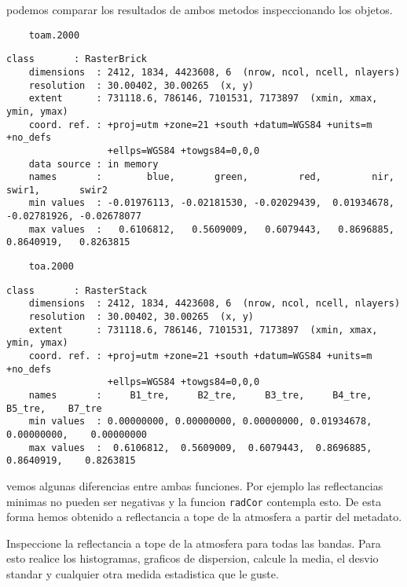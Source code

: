 \begin{exa}
    podemos comparar los resultados de ambos metodos inspeccionando los objetos.
    \begin{lstlisting}
    toam.2000 
    \end{lstlisting}
    \begin{Verbatim}[fontsize=\small]
    class       : RasterBrick 
    dimensions  : 2412, 1834, 4423608, 6  (nrow, ncol, ncell, nlayers)
    resolution  : 30.00402, 30.00265  (x, y)
    extent      : 731118.6, 786146, 7101531, 7173897  (xmin, xmax, ymin, ymax)
    coord. ref. : +proj=utm +zone=21 +south +datum=WGS84 +units=m +no_defs
                  +ellps=WGS84 +towgs84=0,0,0 
    data source : in memory
    names       :        blue,       green,         red,         nir,    swir1,       swir2 
    min values  : -0.01976113, -0.02181530, -0.02029439,  0.01934678,    -0.02781926, -0.02678077 
    max values  :   0.6106812,   0.5609009,   0.6079443,   0.8696885,    0.8640919,   0.8263815 
    \end{Verbatim}
    \begin{lstlisting}
    toa.2000 
    \end{lstlisting}
    \begin{Verbatim}[fontsize=\small]
    class       : RasterStack 
    dimensions  : 2412, 1834, 4423608, 6  (nrow, ncol, ncell, nlayers)
    resolution  : 30.00402, 30.00265  (x, y)
    extent      : 731118.6, 786146, 7101531, 7173897  (xmin, xmax, ymin, ymax)
    coord. ref. : +proj=utm +zone=21 +south +datum=WGS84 +units=m +no_defs
                  +ellps=WGS84 +towgs84=0,0,0 
    names       :     B1_tre,     B2_tre,     B3_tre,     B4_tre,     B5_tre,    B7_tre 
    min values  : 0.00000000, 0.00000000, 0.00000000, 0.01934678, 0.00000000,    0.00000000 
    max values  :  0.6106812,  0.5609009,  0.6079443,  0.8696885,  0.8640919,    0.8263815 
    \end{Verbatim}
    vemos algunas diferencias entre ambas funciones. Por ejemplo las
    reflectancias minimas no pueden ser negativas y la funcion \texttt{radCor}
    contempla esto. De esta forma hemos obtenido a reflectancia a tope de la
    atmosfera a partir del metadato.
    \end{exa}

\begin{act}
    Inspeccione la reflectancia a tope de la atmosfera para todas las bandas.
    Para esto realice los histogramas, graficos de dispersion, calcule la media,
    el desvio standar y cualquier otra medida estadistica que le guste.
\end{act}
